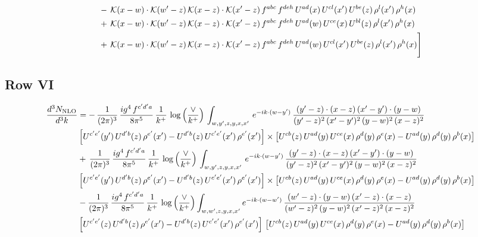 \documentclass[9pt]{article}
\numberwithin{equation}{section}
\begin{document}
\begin{align}
&-\,\mathcal{K}(x-w)\cdot\mathcal{K}(w'-z)\,\mathcal{K}(x-z)\cdot\mathcal{K}(x'-z)\,f^{abc}\,f^{deh}\,U^{ad}(x)\,U^{cl}(x')\,U^{be}(z)\,\rho^{l}(x')\,\rho^{h}(x)\notag \\ 
&+\,\mathcal{K}(x-w)\cdot\mathcal{K}(w'-z)\,\mathcal{K}(x-z)\cdot\mathcal{K}(x'-z)\,f^{abc}\,f^{deh}\,U^{ad}(w)\,U^{ce}(x)\,U^{bl}(z)\,\rho^{l}(x')\,\rho^{h}(x)\notag \\ 
&+\,\mathcal{K}(x-w)\cdot\mathcal{K}(w'-z)\,\mathcal{K}(x-z)\cdot\mathcal{K}(x'-z)\,f^{abc}\,f^{deh}\,U^{ad}(w)\,U^{cl}(x')\,U^{be}(z)\,\rho^{l}(x')\,\rho^{h}(x)\Bigg]
\end{align}
\subsection{Row VI}
\begin{align}
    \frac{d^{3}N_{\rm NLO}}{d^{3}k} & =    -\,\frac{1}{(2\pi)^{3}}\, \frac{ig^{4}\,f^{c'd'a}}{8\pi^{5}}\, \frac{1}{k^{+}}\,\log{\left(\frac{\vee}{k^{+}}\right)}\, \int_{w,y',z,y,x,x'}\, e^{-ik\cdot (w-y')}\,\frac{(y'-z)\cdot (x-z)\,(x'-y')\cdot (y-w)}{(y'-z)^{2}\,(x'-y')^{2}\,(y-w)^{2}\,(x-z)^{2}}\notag \\ & \left[U^{c'e'}(y')\,U^{d'b}(z)\,\rho^{e'}(x')-U^{d'b}(z)\,U^{c'e'}(x')\,\rho^{e'}(x')\right]\times  \left[U^{cb}(z)\,U^{ad}(y)\,U^{ce}(x)\,\rho^{d}(y)\,\rho^{e}(x)-U^{ad}(y)\,\rho^{d}(y)\,\rho^{b}(x)\right] \notag \\
&   +\,\frac{1}{(2\pi)^{3}}\, \frac{ig^{4}\,f^{c'd'a}}{8\pi^{5}}\, \frac{1}{k^{+}}\,\log{\left(\frac{\vee}{k^{+}}\right)}\, \int_{w,y',z,y,x,x'}\, e^{-ik\cdot (w-y')}\,\frac{(y'-z)\cdot (x-z)\,(x'-y')\cdot (y-w)}{(y'-z)^{2}\,(x'-y')^{2}\,(y-w)^{2}\,(x-z)^{2}}\notag \\ &   \left[U^{c'e'}(y')\,U^{d'b}(z)\,\rho^{e'}(x')-U^{d'b}(z)\,U^{c'e'}(x')\,\rho^{e'}(x')\right]\times  \left[U^{cb}(z)\,U^{ad}(y)\,U^{ce}(x)\,\rho^{d}(y)\,\rho^{e}(x)-U^{ad}(y)\,\rho^{d}(y)\,\rho^{b}(x)\right] \notag \\
&   -\frac{1}{(2\pi)^{3}}\, \frac{ig^{4}\,f^{c'd'a}}{8\pi^{5}}\, \frac{1}{k^{+}}\,\log{\left(\frac{\vee}{k^{+}}\right)}\int_{w,w',z,y,x,x'} e^{-ik\cdot (w-w')}\,\frac{(w'-z)\cdot (y-w)\,(x'-z)\cdot (x-z)}{(w'-z)^{2}\,(y-w)^{2}\,(x'-z)^{2}\,(x-z)^{2}}\notag \\
&   \left[U^{c'e'}(z)\,U^{d'b}(z)\,\rho^{e'}(x')-U^{d'b}(z)\,U^{c'e'}(x')\,\rho^{e'}(x')\right]\,\left[U^{cb}(z)\,U^{ad}(y)\,U^{ce}(x)\,\rho^{d}(y)\,\rho^{e}(x)-U^{ad}(y)\,\rho^{d}(y)\,\rho^{b}(x)\right]
\end{align}
\end{document}
